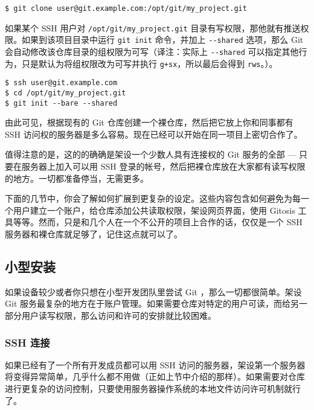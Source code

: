 \documentclass[a4paper]{book}
\begin{document}
\begin{shaded}\begin{verbatim}
$ git clone user@git.example.com:/opt/git/my_project.git
\end{verbatim}\end{shaded}

如果某个 SSH 用户对 \texttt{/opt/git/my\_project.git} 目录有写权限，那他就有推送权限。如果到该项目目录中运行 \texttt{git init} 命令，并加上 \texttt{-{}-shared} 选项，那么 Git 会自动修改该仓库目录的组权限为可写（译注：实际上 \texttt{-{}-shared} 可以指定其他行为，只是默认为将组权限改为可写并执行 \texttt{g+sx}，所以最后会得到 \texttt{rws}。）。

\begin{shaded}\begin{verbatim}
$ ssh user@git.example.com
$ cd /opt/git/my_project.git
$ git init --bare --shared
\end{verbatim}\end{shaded}

由此可见，根据现有的 Git 仓库创建一个裸仓库，然后把它放上你和同事都有 SSH 访问权的服务器是多么容易。现在已经可以开始在同一项目上密切合作了。

值得注意的是，这的的确确是架设一个少数人具有连接权的 Git 服务的全部 --- 只要在服务器上加入可以用 SSH 登录的帐号，然后把裸仓库放在大家都有读写权限的地方。一切都准备停当，无需更多。

下面的几节中，你会了解如何扩展到更复杂的设定。这些内容包含如何避免为每一个用户建立一个账户，给仓库添加公共读取权限，架设网页界面，使用 Gitosis 工具等等。然而，只是和几个人在一个不公开的项目上合作的话，仅仅是一个 SSH 服务器和裸仓库就足够了，记住这点就可以了。

\subsection{小型安装}

如果设备较少或者你只想在小型开发团队里尝试 Git ，那么一切都很简单。架设 Git 服务最复杂的地方在于账户管理。如果需要仓库对特定的用户可读，而给另一部分用户读写权限，那么访问和许可的安排就比较困难。

\subsubsection{SSH 连接}

如果已经有了一个所有开发成员都可以用 SSH 访问的服务器，架设第一个服务器将变得异常简单，几乎什么都不用做（正如上节中介绍的那样）。如果需要对仓库进行更复杂的访问控制，只要使用服务器操作系统的本地文件访问许可机制就行了。
\end{document}

